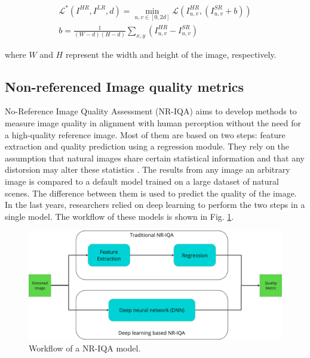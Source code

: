             \begin{equation}
                \begin{aligned}
                    \mathcal{L}^* ( I^{HR}, I^{LR}, d) = \min_{u,v \in [0,2d]} \mathcal{L} ( I^{HR}_{u,v}, (I^{SR}_{u,v}+b)) \\
                    b = \frac{1}{(W - d)(H - d)} \sum_{x,y} \left( I^{HR}_{u,v} - I^{SR}_{u,v} \right)
               \end{aligned}
            \end{equation}
    
            \noindent where $W$ and $H$ represent the width and height of the image, respectively.
    

    \subsection{Non-referenced Image quality metrics}

    No-Reference Image Quality Assessment (NR-IQA) aims to develop methods to measure image quality in alignment with human perception without the need for a high-quality reference image. 
    Most of them are based on two steps: feature extraction and quality prediction using a regression module. 
    They rely on the assumption that natural images share certain statistical information and that any distorsion may alter these statistics \cite{niqe}.
    The results from any image an arbitrary image is compared to a default model trained on a large dataset of natural scenes. 
    The difference  between them is used to predict the quality of the image.
    In the last years, researchers relied on deep learning to perform the two steps in a single model. 
    The workflow of these models is shown in Fig. \ref{fig:4-nr-iqa-workflow}.

    \begin{figure}[h!]
        \centering
        \includegraphics[scale=0.25]{Includes/3-NR-IQA.pdf}
        \caption{Workflow of a NR-IQA model.}
        \label{fig:4-nr-iqa-workflow}
    \end{figure}


